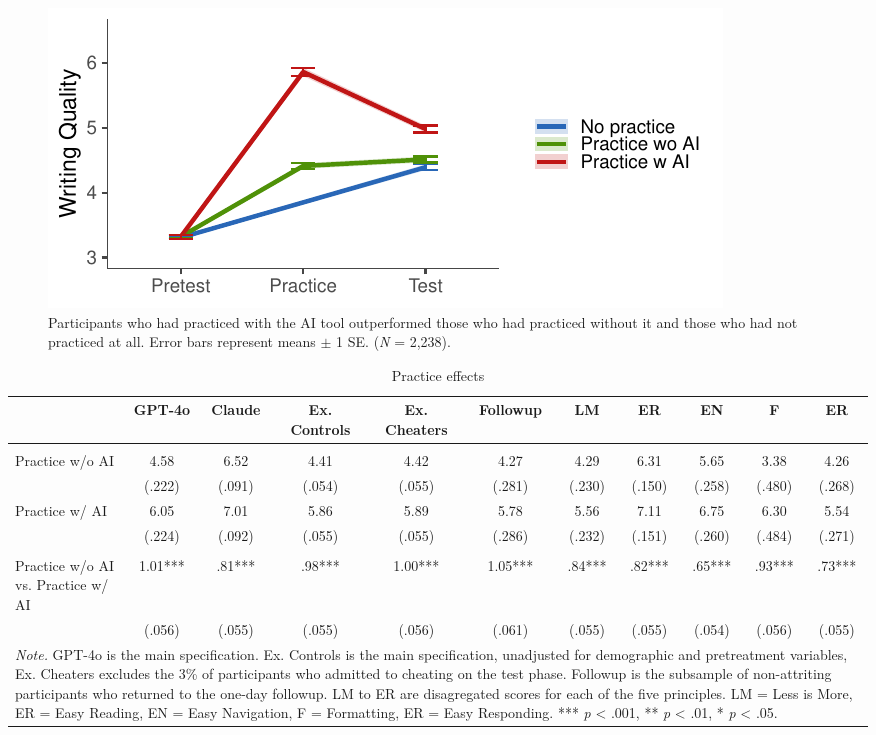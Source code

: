 \documentclass[11pt]{report}
\begin{document}
\begin{append}
\begin{figure}[ht]
    \centering    \includegraphics[width=0.75\linewidth]{mainfig_sup.pdf}     
    \caption{Participants who had practiced with the AI tool outperformed those who had practiced without it and those who had not practiced at all.
    Error bars represent means $\pm$ 1 SE.
    (\textit{N} = 2,238).}
    \label{fig:s2_supplement}
\end{figure}


\begin{table}[ht]
    \centering
    \caption{Practice effects}

\begin{tabular}{lcccccccccc}
\toprule
  & GPT-4o & Claude & Ex. Controls & Ex. Cheaters & Followup & LM & ER & EN & F & ER \\ 
\midrule\addlinespace[2.5pt]
\multicolumn{11}{l}{\textbf{Means --- (SE)}} \\ 
\midrule\addlinespace[2.5pt]
Practice w/o AI & 4.58 & 6.52 & 4.41 & 4.42 & 4.27 & 4.29 & 6.31 & 5.65 & 3.38 & 4.26 \\ 
 & (.222) & (.091) & (.054) & (.055) & (.281) & (.230) & (.150) & (.258) & (.480) & (.268) \\ 
Practice w/ AI & 6.05 & 7.01 & 5.86 & 5.89 & 5.78 & 5.56 & 7.11 & 6.75 & 6.30 & 5.54 \\ 
 & (.224) & (.092) & (.055) & (.055) & (.286) & (.232) & (.151) & (.260) & (.484) & (.271) \\ 
\midrule\addlinespace[2.5pt]
\multicolumn{11}{l}{\textbf{Effect Sizes (d) --- (SE)}} \\ 
\midrule\addlinespace[2.5pt]
Practice w/o AI vs. Practice w/ AI & 1.01*** & .81*** & .98*** & 1.00*** & 1.05*** & .84*** & .82*** & .65*** & .93*** & .73*** \\ 
 & (.056) & (.055) & (.055) & (.056) & (.061) & (.055) & (.055) & (.054) & (.056) & (.055) \\ 
\midrule
\multicolumn{11}{p{16.5cm}}{\textit{Note.} GPT-4o is the main specification. Ex. Controls is the main specification, unadjusted for demographic and pretreatment variables, Ex. Cheaters excludes the 3\% of participants who admitted to cheating on the test phase. Followup is the subsample of non-attriting participants who returned to the one-day followup. LM to ER are disagregated scores for each of the five principles. LM = Less is More, ER = Easy Reading, EN = Easy Navigation, F = Formatting, ER = Easy Responding.  *** \textit{p} < .001, ** \textit{p} < .01, * \textit{p} < .05.}
\vspace{5pt}
\end{tabular}
    \label{tab:s2_practice}
\end{table}


\end{append}
\end{document}

